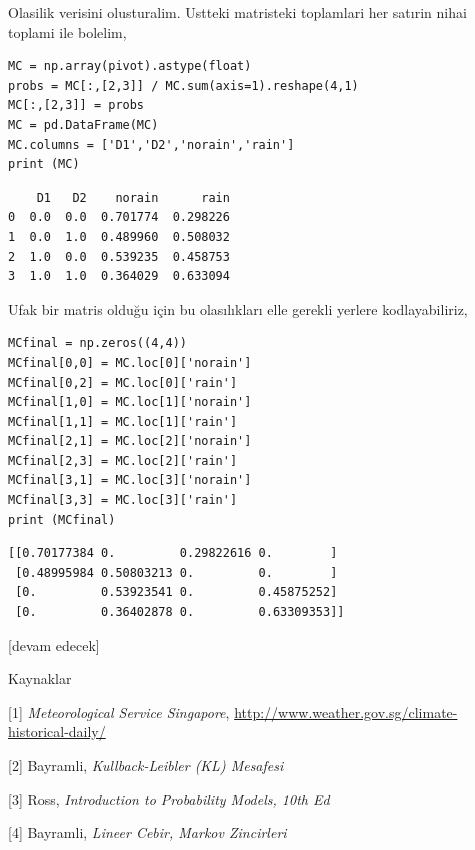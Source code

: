 \documentclass[12pt,fleqn]{article}\usepackage{../../common}
\begin{document}
Olasilik verisini olusturalim. Ustteki matristeki toplamlari her satırin nihai
toplami ile bolelim,

\begin{verbatim}
MC = np.array(pivot).astype(float)
probs = MC[:,[2,3]] / MC.sum(axis=1).reshape(4,1)
MC[:,[2,3]] = probs
MC = pd.DataFrame(MC)
MC.columns = ['D1','D2','norain','rain']
print (MC)
\end{verbatim}

\begin{verbatim}
    D1   D2    norain      rain
0  0.0  0.0  0.701774  0.298226
1  0.0  1.0  0.489960  0.508032
2  1.0  0.0  0.539235  0.458753
3  1.0  1.0  0.364029  0.633094
\end{verbatim}

Ufak bir matris olduğu için bu olasılıkları elle gerekli yerlere kodlayabiliriz,

\begin{verbatim}
MCfinal = np.zeros((4,4))
MCfinal[0,0] = MC.loc[0]['norain']
MCfinal[0,2] = MC.loc[0]['rain']
MCfinal[1,0] = MC.loc[1]['norain']
MCfinal[1,1] = MC.loc[1]['rain']
MCfinal[2,1] = MC.loc[2]['norain']
MCfinal[2,3] = MC.loc[2]['rain']
MCfinal[3,1] = MC.loc[3]['norain']
MCfinal[3,3] = MC.loc[3]['rain']
print (MCfinal)
\end{verbatim}

\begin{verbatim}
[[0.70177384 0.         0.29822616 0.        ]
 [0.48995984 0.50803213 0.         0.        ]
 [0.         0.53923541 0.         0.45875252]
 [0.         0.36402878 0.         0.63309353]]
\end{verbatim}

[devam edecek]

Kaynaklar

[1] {\em Meteorological Service Singapore},
    \url{http://www.weather.gov.sg/climate-historical-daily/}

[2] Bayramli, {\em Kullback-Leibler (KL) Mesafesi}

[3] Ross, {\em Introduction to Probability Models, 10th Ed}

[4] Bayramli, {\em Lineer Cebir, Markov Zincirleri}
\end{document}
